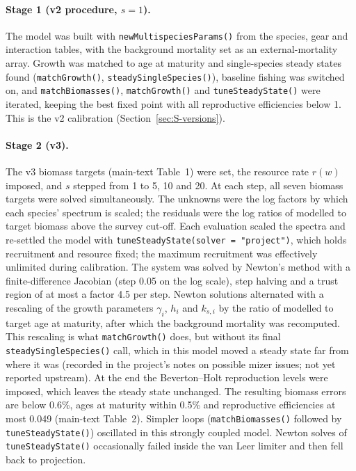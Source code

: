 \documentclass[11pt,letterpaper,fleqn]{article}
\begin{document}
\paragraph{Stage 1 (v2 procedure, $s=1$).} The model was built with \texttt{newMultispeciesParams()} from the species, gear and interaction tables, with the background mortality set as an external-mortality array. Growth was matched to age at maturity and single-species steady states found (\texttt{matchGrowth()}, \texttt{steadySingleSpecies()}), baseline fishing was switched on, and \texttt{matchBiomasses()}, \texttt{matchGrowth()} and \texttt{tuneSteadyState()} were iterated, keeping the best fixed point with all reproductive efficiencies below 1. This is the v2 calibration (Section~\ref{sec:S-versions}).

\paragraph{Stage 2 (v3).} The v3 biomass targets (main-text Table~1) were set, the resource rate $r(w)$ imposed, and $s$ stepped from 1 to 5, 10 and 20. At each step, all seven biomass targets were solved simultaneously. The unknowns were the log factors by which each species' spectrum is scaled; the residuals were the log ratios of modelled to target biomass above the survey cut-off. Each evaluation scaled the spectra and re-settled the model with \texttt{tuneSteadyState(solver = "project")}, which holds recruitment and resource fixed; the maximum recruitment was effectively unlimited during calibration. The system was solved by Newton's method with a finite-difference Jacobian (step 0.05 on the log scale), step halving and a trust region of at most a factor 4.5 per step. Newton solutions alternated with a rescaling of the growth parameters $\gamma_i$, $h_i$ and $k_{s,i}$ by the ratio of modelled to target age at maturity, after which the background mortality was recomputed. This rescaling is what \texttt{matchGrowth()} does, but without its final \texttt{steadySingleSpecies()} call, which in this model moved a steady state far from where it was (recorded in the project's notes on possible mizer issues; not yet reported upstream). At the end the Beverton--Holt reproduction levels were imposed, which leaves the steady state unchanged. The resulting biomass errors are below 0.6\%, ages at maturity within 0.5\% and reproductive efficiencies at most 0.049 (main-text Table~2). Simpler loops (\texttt{matchBiomasses()} followed by \texttt{tuneSteadyState()}) oscillated in this strongly coupled model. Newton solves of \texttt{tuneSteadyState()} occasionally failed inside the van Leer limiter and then fell back to projection.
\end{document}
